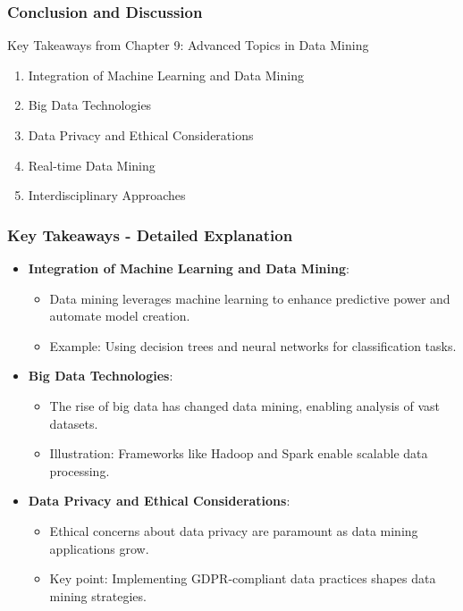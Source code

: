 \documentclass{beamer}
\begin{document}
\begin{frame}[fragile]
    \frametitle{Conclusion and Discussion}
    \begin{block}{Key Takeaways from Chapter 9: Advanced Topics in Data Mining}
        \begin{enumerate}
            \item Integration of Machine Learning and Data Mining
            \item Big Data Technologies
            \item Data Privacy and Ethical Considerations
            \item Real-time Data Mining
            \item Interdisciplinary Approaches
        \end{enumerate}
    \end{block}
\end{frame}

\begin{frame}[fragile]
    \frametitle{Key Takeaways - Detailed Explanation}
    \begin{itemize}
        \item \textbf{Integration of Machine Learning and Data Mining}:
            \begin{itemize}
                \item Data mining leverages machine learning to enhance predictive power and automate model creation.
                \item Example: Using decision trees and neural networks for classification tasks.
            \end{itemize}

        \item \textbf{Big Data Technologies}:
            \begin{itemize}
                \item The rise of big data has changed data mining, enabling analysis of vast datasets.
                \item Illustration: Frameworks like Hadoop and Spark enable scalable data processing.
            \end{itemize}

        \item \textbf{Data Privacy and Ethical Considerations}:
            \begin{itemize}
                \item Ethical concerns about data privacy are paramount as data mining applications grow.
                \item Key point: Implementing GDPR-compliant data practices shapes data mining strategies.
            \end{itemize}
    \end{itemize}
\end{frame}
\end{document}
